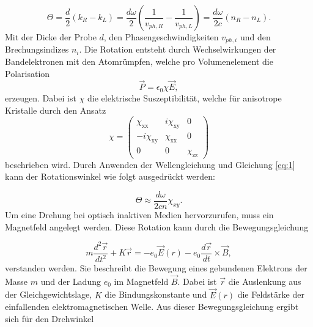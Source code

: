 \begin{equation}
    \Theta = \frac{d}{2} (k_R-k_L) = \frac{d \omega}{2} \left(\frac{1}{v_{ph,R}} - \frac{1}{v_{ph,L}} \right) = \frac{d \omega}{2 c} (n_R - n_L).
\end{equation}
Mit der Dicke der Probe $d$, den Phasengeschwindigkeiten $v_{ph,i}$ und den Brechungsindizes $n_i$.
Die Rotation entsteht durch Wechselwirkungen der Bandelektronen mit den Atomrümpfen, 
welche pro Volumenelement die Polarisation 
\begin{equation}
    \label{eq:1}
    \vec{P} = \epsilon_0 \chi \vec{E},
\end{equation}
erzeugen.
Dabei ist $\chi$ die elektrische Suszeptibilität, welche für anisotrope Kristalle 
durch den Ansatz
\begin{equation}
    \chi =
    \begin{pmatrix}
      \chi_{\text{xx}} & i\chi_{\text{xy}} & 0 \\
      -i \chi_{\text{xy}}& \chi_{\text{xx}} & 0 \\
      0& 0 & \chi_{\text{zz}}
      \end{pmatrix} 
\end{equation}
beschrieben wird.
Durch Anwenden der Wellengleichung und Gleichung \eqref{eq:1} kann der Rotationswinkel 
wie folgt ausgedrückt werden:

\begin{equation}
    \Theta \approx \frac{d \omega}{2 c n} \chi_{xy}.
\end{equation}
Um eine Drehung bei optisch inaktiven Medien hervorzurufen, muss ein Magnetfeld 
angelegt werden. 
Diese Rotation kann durch die Bewegungsgleichung 

\begin{equation}
    m \frac{d^2 \vec{r}}{dt^2} + K \vec{r} = - e_0 \vec{E}(r) - e_0 \frac{d \vec{r}}{d t} \times \vec{B},
\end{equation} 
verstanden werden.
Sie beschreibt die Bewegung eines gebundenen Elektrons der Masse $m$ und der Ladung $e_0$ im Magnetfeld $\vec{B}$.
Dabei ist $\vec{r}$ die Auslenkung aus der Gleichgewichtslage, $K$ die Bindungskonstante 
und $\vec{E}(r)$ die Feldstärke der einfallenden elektromagnetischen Welle.
Aus dieser Bewegungsgleichung ergibt sich für den Drehwinkel

